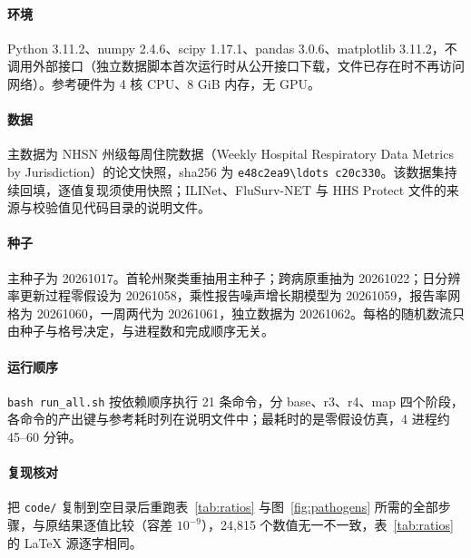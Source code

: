 \documentclass[fontset=none,10pt,a4paper]{ctexart}
\theoremstyle{zhplain}
\begin{document}
\paragraph{环境} Python 3.11.2、numpy 2.4.6、scipy 1.17.1、pandas 3.0.6、matplotlib 3.11.2，不调用外部接口（独立数据脚本首次运行时从公开接口下载，文件已存在时不再访问网络）。参考硬件为 4 核 CPU、8 GiB 内存，无 GPU。

\paragraph{数据} 主数据为 NHSN 州级每周住院数据（Weekly Hospital Respiratory Data Metrics by Jurisdiction）的论文快照，sha256 为 \nolinkurl{e48c2ea9\ldots c20c330}。该数据集持续回填，逐值复现须使用快照；ILINet、FluSurv-NET 与 HHS Protect 文件的来源与校验值见代码目录的说明文件。

\paragraph{种子} 主种子为 20261017。首轮州聚类重抽用主种子；跨病原重抽为 20261022；日分辨率更新过程零假设为 20261058，乘性报告噪声增长期模型为 20261059，报告率网格为 20261060，一周两代为 20261061，独立数据为 20261062。每格的随机数流只由种子与格号决定，与进程数和完成顺序无关。

\paragraph{运行顺序} \nolinkurl{bash run_all.sh} 按依赖顺序执行 21 条命令，分 base、r3、r4、map 四个阶段，各命令的产出键与参考耗时列在说明文件中；最耗时的是零假设仿真，4 进程约 45--60 分钟。

\paragraph{复现核对} 把 \nolinkurl{code/} 复制到空目录后重跑表~\ref{tab:ratios} 与图~\ref{fig:pathogens} 所需的全部步骤，与原结果逐值比较（容差 $10^{-9}$），24,815 个数值无一不一致，表~\ref{tab:ratios} 的 LaTeX 源逐字相同。
\end{document}

